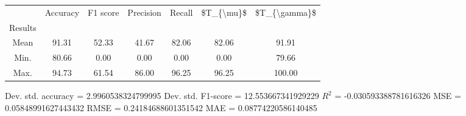 \begin{tabular}{|c|c|c|c|c|c|c|}
\toprule
{} &  Accuracy &  F1 score &  Precision &  Recall &  \$T\_\{\textbackslash mu\}\$ &  \$T\_\{\textbackslash gamma\}\$ \\
Results &           &           &            &         &            &               \\
\hline
Mean    &     91.31 &     52.33 &      41.67 &   82.06 &      82.06 &         91.91 \\
Min.    &     80.66 &      0.00 &       0.00 &    0.00 &       0.00 &         79.66 \\
Max.    &     94.73 &     61.54 &      86.00 &   96.25 &      96.25 &        100.00 \\
\bottomrule
\end{tabular}

 Dev. std. accuracy = 2.9960538324799995
 Dev. std. F1-score = 12.553667341929229
 $R^2$ = -0.030593388781616326
 MSE = 0.05848991627443432
 RMSE = 0.24184688601351542
 MAE = 0.08774220586140485